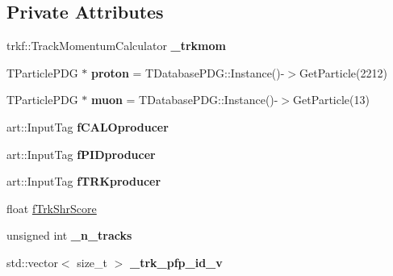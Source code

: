 \subsection*{Private Attributes}
\begin{DoxyCompactItemize}
\item 
trkf\+::\+Track\+Momentum\+Calculator {\bfseries \+\_\+trkmom}\hypertarget{classanalysis_1_1TrackAnalysis_aa69136b70c77e0f034fe009b86ba591b}{}\label{classanalysis_1_1TrackAnalysis_aa69136b70c77e0f034fe009b86ba591b}

\item 
T\+Particle\+P\+DG $\ast$ {\bfseries proton} = T\+Database\+P\+D\+G\+::\+Instance()-\/$>$Get\+Particle(2212)\hypertarget{classanalysis_1_1TrackAnalysis_a4adc7f89c334ab93747a8d4c4abbcc6d}{}\label{classanalysis_1_1TrackAnalysis_a4adc7f89c334ab93747a8d4c4abbcc6d}

\item 
T\+Particle\+P\+DG $\ast$ {\bfseries muon} = T\+Database\+P\+D\+G\+::\+Instance()-\/$>$Get\+Particle(13)\hypertarget{classanalysis_1_1TrackAnalysis_a0fe3b9e7864aaaa36b5f52826b4e3eb9}{}\label{classanalysis_1_1TrackAnalysis_a0fe3b9e7864aaaa36b5f52826b4e3eb9}

\item 
art\+::\+Input\+Tag {\bfseries f\+C\+A\+L\+Oproducer}\hypertarget{classanalysis_1_1TrackAnalysis_a0ceaf940b041eda0237cc73cd330d18d}{}\label{classanalysis_1_1TrackAnalysis_a0ceaf940b041eda0237cc73cd330d18d}

\item 
art\+::\+Input\+Tag {\bfseries f\+P\+I\+Dproducer}\hypertarget{classanalysis_1_1TrackAnalysis_a349dc117e508190c619cd9f47ea7647e}{}\label{classanalysis_1_1TrackAnalysis_a349dc117e508190c619cd9f47ea7647e}

\item 
art\+::\+Input\+Tag {\bfseries f\+T\+R\+Kproducer}\hypertarget{classanalysis_1_1TrackAnalysis_a45abdcf3140e68a2ce90501e33a00eb3}{}\label{classanalysis_1_1TrackAnalysis_a45abdcf3140e68a2ce90501e33a00eb3}

\item 
float \hyperlink{classanalysis_1_1TrackAnalysis_a49502213574f13be542aaab647940ffd}{f\+Trk\+Shr\+Score}
\item 
unsigned int {\bfseries \+\_\+n\+\_\+tracks}\hypertarget{classanalysis_1_1TrackAnalysis_a965f2969aac19332af4597a364586c5d}{}\label{classanalysis_1_1TrackAnalysis_a965f2969aac19332af4597a364586c5d}

\item 
std\+::vector$<$ size\+\_\+t $>$ {\bfseries \+\_\+trk\+\_\+pfp\+\_\+id\+\_\+v}\hypertarget{classanalysis_1_1TrackAnalysis_a204ef1a35c4346e36ffba8ced3c6ce5c}{}\label{classanalysis_1_1TrackAnalysis_a204ef1a35c4346e36ffba8ced3c6ce5c}


\end{DoxyCompactItemize}
